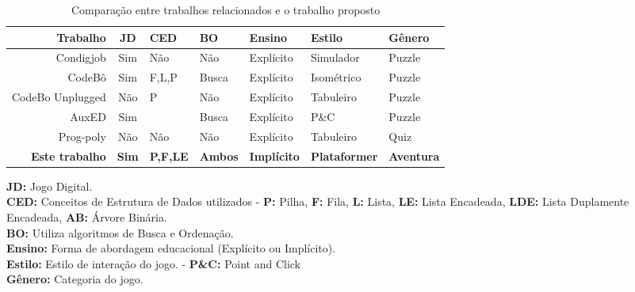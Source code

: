 \begin{table}[H]
	\caption{Comparação entre trabalhos relacionados e o trabalho proposto}
	\label{tab:cmp_trabalhos_relatos}
	\centering
	\footnotesize
	\begin{tabular}{r|clllll}
		\toprule
		\textbf{Trabalho}      & \textbf{JD}  & \textbf{CED}    & \textbf{BO}    & \textbf{Ensino}    & \textbf{Estilo}      & \textbf{Gênero}   \\
		\midrule
		Condigjob              & Sim          & Não             & Não            & Explícito          & Simulador            & Puzzle            \\
		CodeBô                 & Sim          & F,L,P           & Busca          & Explícito          & Isométrico           & Puzzle            \\
		CodeBo Unplugged       & Não          & P               & Não            & Explícito          & Tabuleiro            & Puzzle            \\
		AuxED                  & Sim          &                 & Busca          & Explícito          & P\&C                 & Puzzle            \\
		Prog-poly              & Não          & Não             & Não            & Explícito          & Tabuleiro            & Quiz              \\
		\rowcolor{headergray}
		\textbf{Este trabalho} & \textbf{Sim} & \textbf{P,F,LE} & \textbf{Ambos} & \textbf{Implícito} & \textbf{Plataformer} & \textbf{Aventura} \\
		\bottomrule
	\end{tabular}

	\vspace{1.25em}
	\begin{minipage}{0.8\linewidth}
		\footnotesize
		\textbf{JD:} Jogo Digital. \\
		\textbf{CED:} Conceitos de Estrutura de Dados utilizados -
		\textbf{P:} Pilha, \textbf{F:} Fila, \textbf{L:} Lista, \textbf{LE:} Lista Encadeada, \textbf{LDE:} Lista Duplamente Encadeada, \textbf{AB:} Árvore Binária. \\
		\textbf{BO:} Utiliza algoritmos de Busca e Ordenação. \\
		\textbf{Ensino:} Forma de abordagem educacional (Explícito ou Implícito). \\
		\textbf{Estilo:} Estilo de interação do jogo. - \textbf{P\&C:} Point and Click \\
		\textbf{Gênero:} Categoria do jogo.
	\end{minipage}
\end{table}
